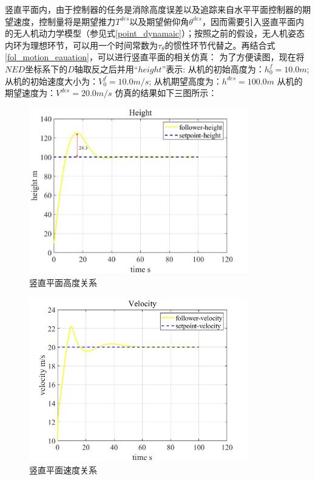 竖直平面内，由于控制器的任务是消除高度误差以及追踪来自水平平面控制器的期望速度，控制量将是期望推力$T^{des}$以及期望俯仰角$\theta^{des}$，因而需要引入竖直平面内的无人机动力学模型（参见式\ref{point_dynamaic}）；按照之前的假设，无人机姿态内环为理想环节，可以用一个时间常数为$\tau_{\theta}$的惯性环节代替之。再结合式\ref{fol_motion_eauation}，可以进行竖直平面的相关仿真：
为了方便读图，现在将$NED$坐标系下的$D$轴取反之后并用“$height$”表示:
从机的初始高度为：$h_0^{f}=10.0m$;
从机的初始速度大小为：$V_0^{f}=10.0m/s$;
从机期望高度为：$h^{des}=100.0m$
从机的期望速度为：$V^{des}=20.0m/s$
仿真的结果如下三图所示：
\begin{figure}[H]
    \centering
    \includegraphics[width=0.85\textwidth]{figures/c5/c5-TECS-height.jpg}
    \caption{竖直平面高度关系}\label{fig:c5-TECS-height}
\end{figure}
\begin{figure}[H]
    \centering
    \includegraphics[width=0.85\textwidth]{figures/c5/c5-TECS-vel.jpg}
    \caption{竖直平面速度关系}\label{fig:c5-TECS-vel}
\end{figure}
